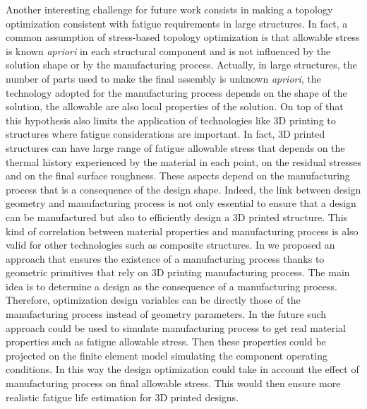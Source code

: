Another interesting challenge for future work consists in making a topology optimization consistent with fatigue requirements in large structures. In fact, a common assumption of stress-based topology optimization is that allowable stress is known \textit{apriori} in each structural component and is not influenced by the solution shape or by the manufacturing process. Actually, in large structures, the number of parts used to make the final assembly is unknown \textit{apriori}, the technology adopted for the manufacturing process depends on the shape of the solution, the allowable are also local properties of the solution. On top of that this hypothesis also limits the application of technologies like 3D printing to structures where fatigue considerations are important. In fact, 3D printed structures can have large range of fatigue allowable stress that depends on the thermal history experienced by the material in each point, on the residual stresses and on the final surface roughness. These aspects depend on the manufacturing process that is a consequence of the design shape. Indeed, the link between design geometry and manufacturing process is not only essential to ensure that a design can be manufactured but also to efficiently design a 3D printed structure. This kind of correlation between material properties and manufacturing process is also valid for other technologies such as composite structures. In \cite{vilas2019Une} we proposed an approach that ensures the existence of a manufacturing process thanks to geometric primitives that rely on 3D printing manufacturing process. The main idea is to determine a design as the consequence of a manufacturing process. Therefore, optimization design variables can be directly those of the manufacturing process instead of geometry parameters. In the future such approach could be used to simulate manufacturing process to get real material properties such as fatigue allowable stress. Then these properties could be projected on the finite element model simulating the component operating conditions. In this way the design optimization could take in account the effect of manufacturing process on final allowable stress. This would then ensure more realistic fatigue life estimation for 3D printed designs.


